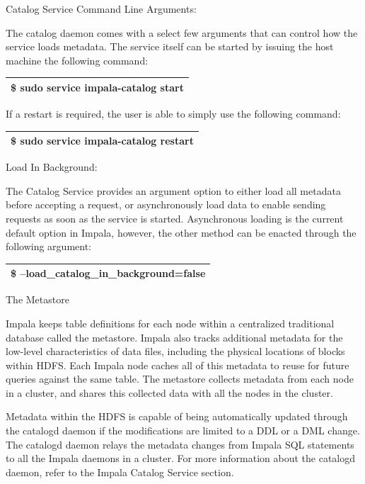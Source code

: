 \documentclass[onecolumn, draftclsnofoot,10pt, compsoc]{IEEEtran}
\begin{document}
Catalog Service Command Line Arguments:

The catalog daemon comes with a select few arguments that can control how the service loads metadata. The service itself can be started by issuing the host machine the following command:
\begin{center}
\begin{tabular}{ |c| }
    \hline
    \$ sudo service impala-catalog start \\
    \hline
\end{tabular}
\end{center}

If a restart is required, the user is able to simply use the following command:

\begin{center}
\begin{tabular}{ |c| }
    \hline
    \$ sudo service impala-catalog restart \\
    \hline
\end{tabular}
\end{center}

Load In Background:

The Catalog Service provides an argument option to either load all metadata before accepting a request, or asynchronously load data to enable sending requests as soon as the service is started.
Asynchronous loading is the current default option in Impala, however, the other method can be enacted through the following argument:

\begin{center}
\begin{tabular}{ |c| }
    \hline
    \$ --load\_catalog\_in\_background=false \\
    \hline
\end{tabular}
\end{center}
The Metastore

Impala keeps table definitions for each node within a centralized traditional database called the metastore.
Impala also tracks additional metadata for the low-level characteristics of data files, including the physical locations of blocks within HDFS.
Each Impala node caches all of this metadata to reuse for future queries against the same table. 
The metastore collects metadata from each node in a cluster, and shares this collected data with all the nodes in the cluster.

Metadata within the HDFS is capable of being automatically updated through the catalogd daemon if the modifications are limited to a DDL or a DML change. 
The catalogd daemon relays the metadata changes from Impala SQL statements to all the Impala daemons in a cluster.
For more information about the catalogd daemon, refer to the Impala Catalog Service section. 
 
\end{document}
